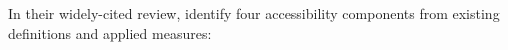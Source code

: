 


In their widely-cited review, \citet{Geurs2004AccessibilityReview} identify four accessibility components 
from existing definitions and applied measures:

